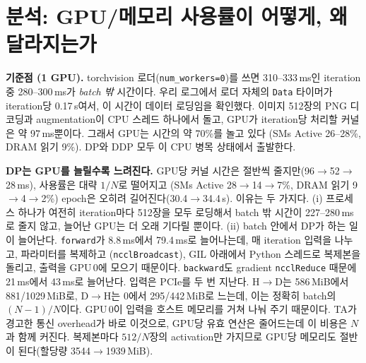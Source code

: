 \documentclass[11pt,a4paper]{article}
\begin{document}
\begin{table}[h]
\centering\small
\caption{우리 Vast.ai 실행 (epoch 동안 nvidia-smi를 200\,ms 간격으로 기록; mem. = GPU당 최대 할당량 / nvidia-smi 최대값).}
\label{tab:ours}

\end{table}

\section{분석: GPU/메모리 사용률이 어떻게, 왜 달라지는가}

\textbf{기준점 (1 GPU).} torchvision 로더(\texttt{num\_workers=0})를 쓰면 310--333\,ms인 iteration 중 280--300\,ms가 \emph{batch 밖} 시간이다.
우리 로그에서 로더 자체의 \texttt{Data} 타이머가 iteration당 0.17\,s여서, 이 시간이 데이터 로딩임을 확인했다. 이미지 512장의 PNG 디코딩과
augmentation이 CPU 스레드 하나에서 돌고, GPU가 iteration당 처리할 커널은 약 97\,ms뿐이다. 그래서 GPU는 시간의 약 70\%를 놀고 있다
(SMs Active 26--28\%, DRAM 읽기 9\%). DP와 DDP 모두 이 CPU 병목 상태에서 출발한다.

\textbf{DP는 GPU를 늘릴수록 느려진다.} GPU당 커널 시간은 절반씩 줄지만(96$\rightarrow$52$\rightarrow$28\,ms), 사용률은 대략 $1/N$로 떨어지고
(SMs Active 28$\rightarrow$14$\rightarrow$7\%, DRAM 읽기 9$\rightarrow$4$\rightarrow$2\%) epoch은 오히려 길어진다(30.4$\rightarrow$34.4\,s). 이유는 두 가지다.
(i) 프로세스 하나가 여전히 iteration마다 512장을 모두 로딩해서 batch 밖 시간이 227--280\,ms로 줄지 않고, 늘어난 GPU는 더 오래 기다릴 뿐이다.
(ii) batch 안에서 DP가 하는 일이 늘어난다. \texttt{forward}가 8.8\,ms에서 79.4\,ms로 늘어나는데, 매 iteration 입력을 나누고, 파라미터를 복제하고
(\texttt{ncclBroadcast}), GIL 아래에서 Python 스레드로 복제본을 돌리고, 출력을 GPU\,0에 모으기 때문이다. \texttt{backward}도 gradient \texttt{ncclReduce}
때문에 21\,ms에서 43\,ms로 늘어난다. 입력은 PCIe를 두 번 지난다. H$\to$D는 586\,MiB에서 881/1029\,MiB로, D$\to$H는 0에서 295/442\,MiB로 느는데,
이는 정확히 batch의 $(N{-}1)/N$이다. GPU\,0이 입력을 호스트 메모리를 거쳐 나눠 주기 때문이다. TA가 경고한 통신 overhead가 바로 이것으로,
GPU당 유효 연산은 줄어드는데 이 비용은 $N$과 함께 커진다. 복제본마다 $512/N$장의 activation만 가지므로 GPU당 메모리도 절반이 된다(할당량 3544$\rightarrow$1939\,MiB).
\end{document}
